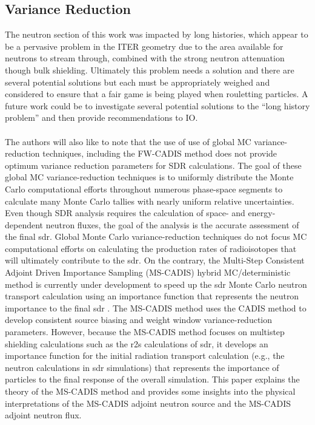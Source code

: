 \documentclass[12pt]{article}
\begin{document}
\subsection*{Variance Reduction}
The neutron section of this work was impacted by long histories, which appear to
be a pervasive problem in the ITER geometry due to the area available for
neutrons to stream through, combined with the strong neutron attenuation though
bulk shielding. Ultimately this problem needs a solution and there are several
potential solutions but each must be appropriately weighed and considered to
ensure that a fair game is being played when rouletting particles. A future
work could be to investigate several potential solutions to the ``long history
problem'' and then provide recommendations to IO.
\\
\\
The authors will also like to note that the use of use of global MC 
variance-reduction techniques, including the FW-CADIS method does not 
provide optimum variance reduction parameters for SDR calculations. 
The goal of these global MC variance-reduction techniques is to uniformly 
distribute the Monte Carlo computational efforts throughout numerous 
phase-space segments to calculate many Monte Carlo tallies with nearly 
uniform relative uncertainties. Even though SDR analysis requires the 
calculation of space- and energy-dependent neutron fluxes, the goal of 
the analysis is the accurate assessment of the final \gls{sdr}. Global 
Monte Carlo variance-reduction techniques do not focus MC computational 
efforts on calculating the production rates of radioisotopes that will 
ultimately contribute to the \gls{sdr}. On the contrary, the Multi-Step 
Consistent Adjoint Driven Importance Sampling (MS-CADIS) hybrid 
MC/deterministic method is currently under development to speed up the \gls{sdr}
 Monte Carlo neutron transport calculation using an importance function that 
represents the neutron importance to the final \gls{sdr} \cite{mscadis}. 
The MS-CADIS method uses the CADIS method to develop consistent source biasing 
and weight window variance-reduction parameters. However, because the MS-CADIS 
method focuses on multistep shielding calculations such as the \gls{r2s} 
calculations of \gls{sdr}, it develops an importance function for the initial 
radiation transport calculation (e.g., the neutron calculations in \gls{sdr} 
simulations) that represents the importance of particles to the final response
 of the overall simulation. This paper explains the theory of the MS-CADIS 
method and provides some insights into the physical interpretations of the 
MS-CADIS adjoint neutron source and the MS-CADIS adjoint neutron flux.
\end{document}

